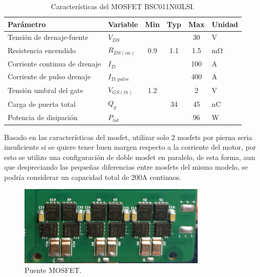 \documentclass[11pt]{report}
\begin{document}
\begin{table}[h!]
	\centering
	\caption{Características del MOSFET BSC011N03LSI.}
	\begin{tabular}{l l c c c l}
		\hline
		\textbf{Parámetro}            & \textbf{Variable} & \textbf{Min} & \textbf{Typ} & \textbf{Max} & \textbf{Unidad}    \\
		\hline
		Tensión de drenaje-fuente     & $V_{DS}$          &              &              & 30           & $\mathrm{V}$       \\
		Resistencia encendido         & $R_{DS(on)}$      & 0.9          & 1.1          & 1.5          & $\mathrm{m\Omega}$ \\
		Corriente continua de drenaje & $I_D$             &              &              & 100          & $\mathrm{A}$       \\
		Corriente de pulso drenaje    & $I_{D,pulse}$     &              &              & 400          & $\mathrm{A}$       \\
		Tensión umbral del gate       & $V_{GS(th)}$      & 1.2          &              & 2            & $\mathrm{V}$       \\
		Carga de puerta total         & $Q_g$             &              & 34           & 45           & $\mathrm{nC}$      \\
		Potencia de disipación        & $P_{tot}$         &              &              & 96           & $\mathrm{W}$       \\
		\hline
	\end{tabular}
\end{table}
\FloatBarrier

\newpage
Basado en las características del mosfet, utilizar solo 2 mosfets por pierna seria insuficiente si se quiere tener buen margen respecto a la corriente del motor, por esto se utilizo una configuración de doble mosfet en paralelo, de esta forma, aun que despreciando las pequeñas diferencias entre mosfets del mismo modelo, se podría considerar un capacidad total de 200A continuos.

\begin{figure}[ht]
	\centering
	\includegraphics[width=0.8\textwidth]{imagenes/PCB/puente mosfet.jpg}
	\caption{Puente MOSFET.}
	\label{puente}
\end{figure}
\FloatBarrier
\end{document}
